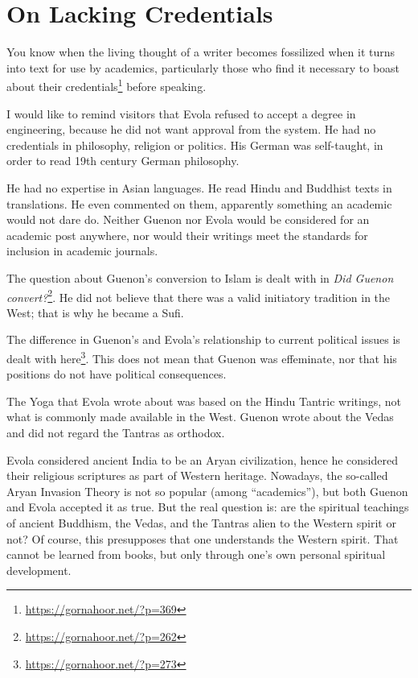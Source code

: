 \section{On Lacking Credentials}

You know when the living thought of a writer becomes fossilized when it turns into text for use by academics, particularly those who find it necessary to boast about their credentials\footnote{\url{https://gornahoor.net/?p=369}} before speaking.

I would like to remind visitors that Evola refused to accept a degree in engineering, because he did not want approval from the system. He had no credentials in philosophy, religion or politics. His German was self-taught, in order to read 19th century German philosophy.

He had no expertise in Asian languages. He read Hindu and Buddhist texts in translations. He even commented on them, apparently something an academic would not dare do. Neither Guenon nor Evola would be considered for an academic post anywhere, nor would their writings meet the standards for inclusion in academic journals.

The question about Guenon's conversion to Islam is dealt with in \textit{Did Guenon convert?}\footnote{\url{https://gornahoor.net/?p=262}}. He did not believe that there was a valid initiatory tradition in the West; that is why he became a Sufi.

The difference in Guenon's and Evola's relationship to current political issues is dealt with here\footnote{\url{https://gornahoor.net/?p=273}}. This does not mean that Guenon was effeminate, nor that his positions do not have political consequences.

The Yoga that Evola wrote about was based on the Hindu Tantric writings, not what is commonly made available in the West. Guenon wrote about the Vedas and did not regard the Tantras as orthodox.

Evola considered ancient India to be an Aryan civilization, hence he considered their religious scriptures as part of Western heritage. Nowadays, the so-called Aryan Invasion Theory is not so popular (among ``academics''), but both Guenon and Evola accepted it as true. But the real question is: are the spiritual teachings of ancient Buddhism, the Vedas, and the Tantras alien to the Western spirit or not? Of course, this presupposes that one understands the Western spirit. That cannot be learned from books, but only through one's own personal spiritual development.


